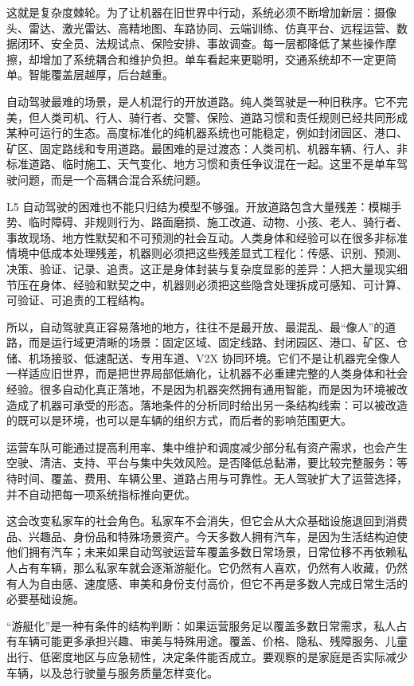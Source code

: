 这就是复杂度棘轮。为了让机器在旧世界中行动，系统必须不断增加新层：摄像头、雷达、激光雷达、高精地图、车路协同、云端训练、仿真平台、远程运营、数据闭环、安全员、法规试点、保险安排、事故调查。每一层都降低了某些操作摩擦，却增加了系统耦合和维护负担。单车看起来更聪明，交通系统却不一定更简单。智能覆盖层越厚，后台越重。

自动驾驶最难的场景，是人机混行的开放道路。纯人类驾驶是一种旧秩序。它不完美，但人类司机、行人、骑行者、交警、保险、道路习惯和责任规则已经共同形成某种可运行的生态。高度标准化的纯机器系统也可能稳定，例如封闭园区、港口、矿区、固定路线和专用道路。最困难的是过渡态：人类司机、机器车辆、行人、非标准道路、临时施工、天气变化、地方习惯和责任争议混在一起。这里不是单车驾驶问题，而是一个高耦合混合系统问题。

L5 自动驾驶的困难也不能只归结为模型不够强。开放道路包含大量残差：模糊手势、临时障碍、非规则行为、路面磨损、施工改道、动物、小孩、老人、骑行者、事故现场、地方性默契和不可预测的社会互动。人类身体和经验可以在很多非标准情境中低成本处理残差，机器则必须把这些残差显式工程化：传感、识别、预测、决策、验证、记录、追责。这正是身体封装与复杂度显影的差异：人把大量现实细节压在身体、经验和默契之中，机器则必须把这些隐含处理拆成可感知、可计算、可验证、可追责的工程结构。

所以，自动驾驶真正容易落地的地方，往往不是最开放、最混乱、最“像人”的道路，而是运行域更清晰的场景：固定区域、固定线路、封闭园区、港口、矿区、仓储、机场接驳、低速配送、专用车道、V2X 协同环境。它们不是让机器完全像人一样适应旧世界，而是把世界局部低熵化，让机器不必重建完整的人类身体和社会经验。很多自动化真正落地，不是因为机器突然拥有通用智能，而是因为环境被改造成了机器可承受的形态。落地条件的分析同时给出另一条结构线索：可以被改造的既可以是环境，也可以是车辆的组织方式，而后者的影响范围更大。


运营车队可能通过提高利用率、集中维护和调度减少部分私有资产需求，也会产生空驶、清洁、支持、平台与集中失效风险。是否降低总黏滞，要比较完整服务：等待时间、覆盖、费用、车辆公里、道路占用与可靠性。无人驾驶扩大了运营选择，并不自动把每一项系统指标推向更优。

这会改变私家车的社会角色。私家车不会消失，但它会从大众基础设施退回到消费品、兴趣品、身份品和特殊场景资产。今天多数人拥有汽车，是因为生活结构迫使他们拥有汽车；未来如果自动驾驶运营车覆盖多数日常场景，日常位移不再依赖私人占有车辆，那么私家车就会逐渐游艇化。它仍然有人喜欢，仍然有人收藏，仍然有人为自由感、速度感、审美和身份支付高价，但它不再是多数人完成日常生活的必要基础设施。

“游艇化”是一种有条件的结构判断：如果运营服务足以覆盖多数日常需求，私人占有车辆可能更多承担兴趣、审美与特殊用途。覆盖、价格、隐私、残障服务、儿童出行、低密度地区与应急韧性，决定条件能否成立。要观察的是家庭是否实际减少车辆，以及总行驶量与服务质量怎样变化。

